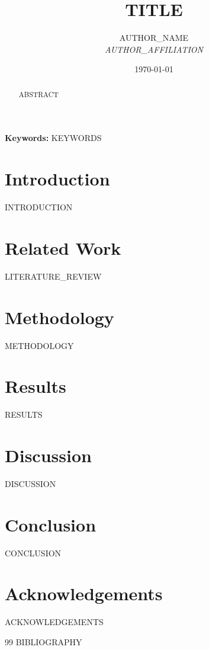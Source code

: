 \documentclass[12pt]{article}
\title{{{TITLE}}}
\author{{{AUTHOR_NAME}} \\
\textit{{{AUTHOR_AFFILIATION}}}}
\date{\today}
\begin{document}
\maketitle

\begin{abstract}
{{ABSTRACT}}
\end{abstract}

\textbf{Keywords:} {{KEYWORDS}}

\section{Introduction}
{{INTRODUCTION}}

\section{Related Work}
{{LITERATURE_REVIEW}}

\section{Methodology}
{{METHODOLOGY}}

\section{Results}
{{RESULTS}}

\section{Discussion}
{{DISCUSSION}}

\section{Conclusion}
{{CONCLUSION}}

\section*{Acknowledgements}
{{ACKNOWLEDGEMENTS}}


\begin{thebibliography}{99}
{{BIBLIOGRAPHY}}
\end{thebibliography}
\end{document}
